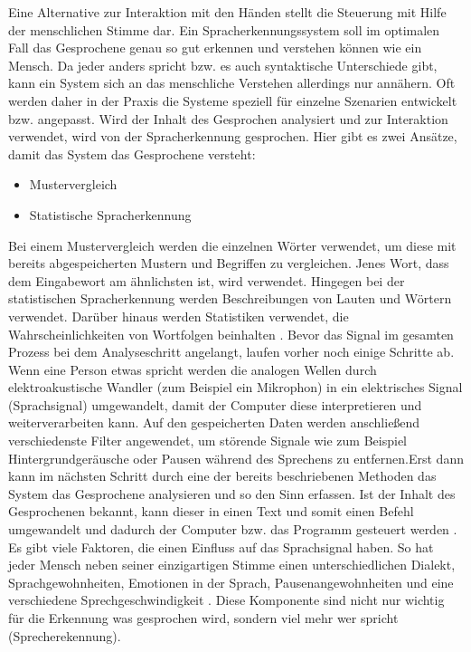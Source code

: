 Eine Alternative zur Interaktion mit den Händen stellt die Steuerung mit Hilfe der menschlichen Stimme dar. Ein Spracherkennungssystem soll im optimalen Fall das Gesprochene genau so gut erkennen und verstehen können wie ein Mensch. Da jeder anders spricht bzw. es auch syntaktische Unterschiede gibt, kann ein System sich an das menschliche Verstehen allerdings nur annähern. Oft werden daher in der Praxis die Systeme speziell für einzelne Szenarien entwickelt bzw. angepasst. 
\newlinew \newline
Wird der Inhalt des Gesprochen analysiert und zur Interaktion verwendet, wird von der Spracherkennung gesprochen. Hier gibt es zwei Ansätze, damit das System das Gesprochene versteht:
\begin{itemize}
      \item Mustervergleich
      \item Statistische Spracherkennung
\end{itemize}
\vspace{\baselineskip}
Bei einem Mustervergleich werden die einzelnen Wörter verwendet, um diese mit bereits abgespeicherten Mustern und Begriffen zu vergleichen. Jenes Wort, dass dem Eingabewort am ähnlichsten ist, wird verwendet.
Hingegen bei der statistischen Spracherkennung werden Beschreibungen von Lauten und Wörtern verwendet. Darüber hinaus werden Statistiken verwendet, die Wahrscheinlichkeiten von Wortfolgen beinhalten \cite{KaufmannPfisterSprache}. 
\newline
\newline
Bevor das Signal im gesamten Prozess bei dem Analyseschritt angelangt, laufen vorher noch einige Schritte ab. Wenn eine Person etwas spricht werden die analogen Wellen durch elektroakustische Wandler (zum Beispiel ein Mikrophon) in ein elektrisches Signal (Sprachsignal) umgewandelt, damit der Computer diese interpretieren und weiterverarbeiten kann. Auf den gespeicherten Daten werden anschließend verschiedenste Filter angewendet, um störende Signale wie zum Beispiel Hintergrundgeräusche oder Pausen während des Sprechens zu entfernen.Erst dann kann im nächsten Schritt durch eine der bereits beschriebenen Methoden das System das Gesprochene analysieren und so den Sinn erfassen. Ist der Inhalt des Gesprochenen bekannt, kann dieser in einen Text und somit einen Befehl umgewandelt und dadurch der Computer bzw. das Programm gesteuert werden \cite{KaufmannPfisterSprache}.
\newline \newline
Es gibt viele Faktoren, die einen Einfluss auf das Sprachsignal haben. So hat jeder Mensch neben seiner einzigartigen Stimme einen unterschiedlichen Dialekt, Sprachgewohnheiten, Emotionen in der Sprach, Pausenangewohnheiten und eine verschiedene Sprechgeschwindigkeit \cite{KaufmannPfisterSprache}. Diese Komponente sind nicht nur wichtig für die Erkennung was gesprochen wird, sondern viel mehr wer spricht (Sprecherekennung).
